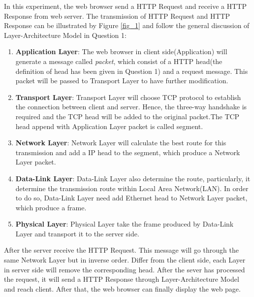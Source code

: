 \documentclass[10pt,a4paper]{article}
\begin{document}
In this experiment, the web browser send a HTTP Request and receive a HTTP Response from web server. The transmission of HTTP Request and HTTP Response can be illustrated by Figure \ref{fig_1} and follow the general discussion of Layer-Architecture Model in Question 1:
\begin{enumerate}
	\item \textbf{Application Layer}: The web browser in client side(Application) will generate a message called \textit{packet}, which consist of a HTTP head(the definition of head has been given in Question 1) and a request message. This packet will be passed to Transport Layer to have further modification.
	\item \textbf{Transport Layer}: Transport Layer will choose TCP protocol to establish the connection between client and server. Hence, the three-way handshake is required and the TCP head will be added to the original packet.The TCP head append with Application Layer packet is called segment.
	\item \textbf{Network Layer}: Network Layer will calculate the best route for this transmission and add a IP head to the segment, which produce a Network Layer packet.
	\item \textbf{Data-Link Layer}: Data-Link Layer also determine the route, particularly, it determine the transmission route within Local Area Network(LAN). In order to do so, Data-Link Layer need add Ethernet head to Network Layer packet, which produce a frame. 
	\item \textbf{Physical Layer}: Physical Layer take the frame produced by Data-Link Layer and transport it to the server side.
\end{enumerate}
After the server receive the HTTP Request. This message will go through the same Network Layer but in inverse order. Differ from the client side, each Layer in server side will remove the corresponding head. After the sever has processed the request, it will send a HTTP Response through Layer-Architecture Model and reach client. After that, the web browser can finally display the web page.
\end{document}
